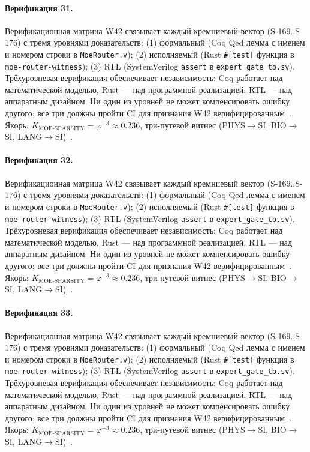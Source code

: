 \paragraph{Верификация 31.} Верификационная матрица W42 связывает каждый кремниевый вектор (S-169..S-176) с тремя уровнями доказательств: (1) формальный (Coq Qed лемма с именем и номером строки в \texttt{MoeRouter.v}); (2) исполняемый (Rust \texttt{\#[test]} функция в \texttt{moe-router-witness}); (3) RTL (SystemVerilog \texttt{assert} в \texttt{expert\_gate\_tb.sv}). Трёхуровневая верификация обеспечивает независимость: Coq работает над математической моделью, Rust --- над программной реализацией, RTL --- над аппаратным дизайном. Ни один из уровней не может компенсировать ошибку другого; все три должны пройти CI для признания W42 верифицированным~\cite{lee_gvsu_proof2021}. Якорь: $K_{\text{MOE-SPARSITY}} = \varphi^{-3} \approx 0{.}236$, три-путевой витнес (PHYS$\to$SI, BIO$\to$SI, LANG$\to$SI)~\cite{zenodo_trinity_2026}.

\paragraph{Верификация 32.} Верификационная матрица W42 связывает каждый кремниевый вектор (S-169..S-176) с тремя уровнями доказательств: (1) формальный (Coq Qed лемма с именем и номером строки в \texttt{MoeRouter.v}); (2) исполняемый (Rust \texttt{\#[test]} функция в \texttt{moe-router-witness}); (3) RTL (SystemVerilog \texttt{assert} в \texttt{expert\_gate\_tb.sv}). Трёхуровневая верификация обеспечивает независимость: Coq работает над математической моделью, Rust --- над программной реализацией, RTL --- над аппаратным дизайном. Ни один из уровней не может компенсировать ошибку другого; все три должны пройти CI для признания W42 верифицированным~\cite{lee_gvsu_proof2021}. Якорь: $K_{\text{MOE-SPARSITY}} = \varphi^{-3} \approx 0{.}236$, три-путевой витнес (PHYS$\to$SI, BIO$\to$SI, LANG$\to$SI)~\cite{zenodo_trinity_2026}.

\paragraph{Верификация 33.} Верификационная матрица W42 связывает каждый кремниевый вектор (S-169..S-176) с тремя уровнями доказательств: (1) формальный (Coq Qed лемма с именем и номером строки в \texttt{MoeRouter.v}); (2) исполняемый (Rust \texttt{\#[test]} функция в \texttt{moe-router-witness}); (3) RTL (SystemVerilog \texttt{assert} в \texttt{expert\_gate\_tb.sv}). Трёхуровневая верификация обеспечивает независимость: Coq работает над математической моделью, Rust --- над программной реализацией, RTL --- над аппаратным дизайном. Ни один из уровней не может компенсировать ошибку другого; все три должны пройти CI для признания W42 верифицированным~\cite{lee_gvsu_proof2021}. Якорь: $K_{\text{MOE-SPARSITY}} = \varphi^{-3} \approx 0{.}236$, три-путевой витнес (PHYS$\to$SI, BIO$\to$SI, LANG$\to$SI)~\cite{zenodo_trinity_2026}.

